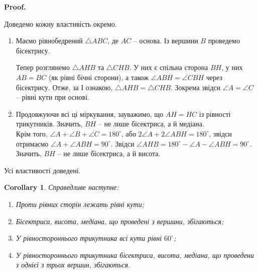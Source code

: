 \documentclass[a4paper, 10pt]{article}
\makeatletter
\theoremstyle{theoremdd}
\theoremstyle{theoremdd}
\theoremstyle{theoremdd}
\theoremstyle{theoremdd}
\theoremstyle{theoremdd}
\theoremstyle{theoremdd}
\theoremstyle{theoremdd}
\theoremstyle{theoremdd}
\theoremstyle{theoremdd}
\newtheorem{corollary}[theorem]{Corollary}
\renewenvironment{proof}[1][Proof.\\]{\par
\pushQED{\hfill \qed}%
\normalfont \topsep6\p@\@plus6\p@\relax
\trivlist
\item\relax
{\bfseries
#1\@addpunct{.}}\hspace\labelsep\ignorespaces
}{%
\popQED\endtrivlist\@endpefalse
}
\makeatother
\begin{document}
\begin{proof}
Доведемо кожну властивість окремо.
\begin{enumerate}[wide=0pt,label={\arabic*)}]
\item Маємо рівнобедрений $\triangle ABC$, де $AC$ -- основа. Із вершини $B$ проведемо бісектрису.
\begin{figure}[H]
\centering
{}
\end{figure}
Тепер розглянемо $\triangle AHB$ та $\triangle CHB$. У них є спільна сторона $BH$, у них $AB = BC$ (як рівні бічні сторони), а також $\angle ABH = \angle CBH$ через бісектрису. Отже, за І ознакою, $\triangle AHB = \triangle CHB$. Зокрема звідси $\angle A = \angle C$ -- рівні кути при основі.
\item Продовжуючи всі ці міркування, зауважимо, що $AH = HC$ із рівності трикутників. Значить, $BH$ -- не лише бісектриса, а й медіана. \\
Крім того, $\angle A + \angle B + \angle C = 180^\circ$, або $2 \angle A + 2 \angle ABH = 180^\circ$, звідси отримаємо $\angle A + \angle ABH = 90^\circ$. Звідси $\angle AHB = 180^\circ - \angle A - \angle ABH = 90^\circ$. Значить, $BH$ -- не лише бісектриса, а й висота.
\end{enumerate}
Усі властивості доведені.
\end{proof}

\begin{corollary}
Справедливе наступне:
\begin{enumerate}[nosep,wide=0pt,label={\arabic*)}]
\item Проти рівних сторін лежать рівні кути;
\item Бісектриса, висота, медіана, що проведені з вершини, збігаються;
\item У рівностороннього трикутника всі кути рівні $60^\circ$;
\item У рівностороннього трикутника бісектриса, висота, медіана, що проведени з однієї з трьох вершин, збігаються.
\end{enumerate}
\end{corollary}
\end{document}
